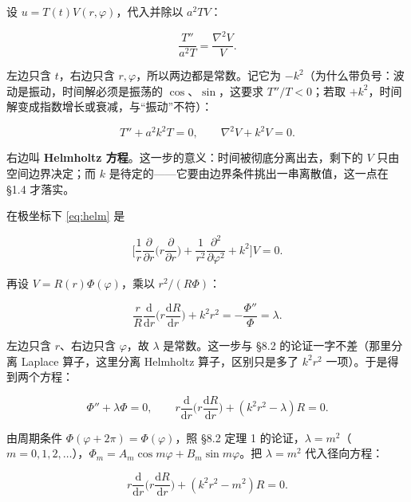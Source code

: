 \documentclass[11pt]{ctexart}
\let\origsubhdr\subhdr
\renewcommand{\subhdr}[1]{\par\needspace{3\baselineskip}\origsubhdr{#1}}
\begin{document}
设 $u=T(t)V(r,\varphi)$，代入并除以 $a^2TV$：

\[
\frac{T''}{a^2T}=\frac{\nabla^2V}{V}.
\]

左边只含 $t$，右边只含 $r,\varphi$，所以两边都是常数。记它为 $-k^2$（为什么带负号：波动是振动，时间解必须是振荡的 $\cos$、$\sin$，这要求 $T''/T<0$；若取 $+k^2$，时间解变成指数增长或衰减，与“振动”不符）：

\begin{equation}
T''+a^2k^2T=0,
\qquad
\nabla^2V+k^2V=0 .
\label{eq:helm}
\end{equation}

右边叫 \textbf{Helmholtz 方程}。这一步的意义：时间被彻底分离出去，剩下的 $V$ 只由空间边界决定；而 $k$ 是待定的——它要由边界条件挑出一串离散值，这一点在 \S1.4 才落实。


在极坐标下 \eqref{eq:helm} 是

\begin{equation}
\Big[\frac1r\frac{\partial}{\partial r}\Big(r\frac{\partial}{\partial r}\Big)+\frac1{r^2}\frac{\partial^2}{\partial\varphi^2}+k^2\Big]V=0 .
\label{eq:helmPolar}
\end{equation}

再设 $V=R(r)\Phi(\varphi)$，乘以 $r^2/(R\Phi)$：

\begin{equation}
\frac{r}{R}\frac{\mathrm d}{\mathrm dr}\Big(r\frac{\mathrm dR}{\mathrm dr}\Big)+k^2r^2=-\frac{\Phi''}{\Phi}=\lambda .
\label{eq:sep2}
\end{equation}

左边只含 $r$、右边只含 $\varphi$，故 $\lambda$ 是常数。这一步与 \S8.2 的论证一字不差（那里分离 Laplace 算子，这里分离 Helmholtz 算子，区别只是多了 $k^2r^2$ 一项）。于是得到两个方程：

\begin{equation}
\Phi''+\lambda\Phi=0,
\qquad
r\frac{\mathrm d}{\mathrm dr}\Big(r\frac{\mathrm dR}{\mathrm dr}\Big)+(k^2r^2-\lambda)R=0 .
\label{eq:two}
\end{equation}

由周期条件 $\Phi(\varphi+2\pi)=\Phi(\varphi)$，照 \S8.2 定理 1 的论证，$\lambda=m^2$（$m=0,1,2,\dots$），$\Phi_m=A_m\cos m\varphi+B_m\sin m\varphi$。把 $\lambda=m^2$ 代入径向方程：

\begin{equation}
r\frac{\mathrm d}{\mathrm dr}\Big(r\frac{\mathrm dR}{\mathrm dr}\Big)+(k^2r^2-m^2)R=0 .
\label{eq:radial}
\end{equation}
\end{document}
